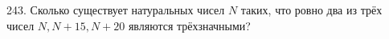 243. Сколько существует натуральных чисел $N$ таких, что ровно два из трёх чисел $N, N+15, N+20$ являются трёхзначными?\\

